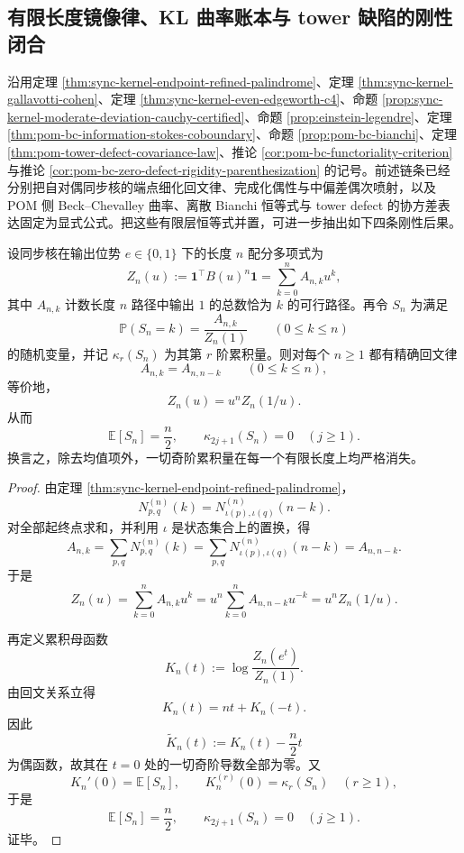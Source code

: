 \subsection{有限长度镜像律、KL 曲率账本与 tower 缺陷的刚性闭合}\label{subsec:conclusion-finite-mirror-curvature-tower-rigidity}
沿用定理 \ref{thm:sync-kernel-endpoint-refined-palindrome}、定理 \ref{thm:sync-kernel-gallavotti-cohen}、定理 \ref{thm:sync-kernel-even-edgeworth-c4}、命题 \ref{prop:sync-kernel-moderate-deviation-cauchy-certified}、命题 \ref{prop:einstein-legendre}、定理 \ref{thm:pom-bc-information-stokes-coboundary}、命题 \ref{prop:pom-bc-bianchi}、定理 \ref{thm:pom-tower-defect-covariance-law}、推论 \ref{cor:pom-bc-functoriality-criterion} 与推论 \ref{cor:pom-bc-zero-defect-rigidity-parenthesization} 的记号。前述链条已经分别把自对偶同步核的端点细化回文律、完成化偶性与中偏差偶次喷射，以及 POM 侧 Beck--Chevalley 曲率、离散 Bianchi 恒等式与 tower defect 的协方差表达固定为显式公式。把这些有限层恒等式并置，可进一步抽出如下四条刚性后果。

\begin{theorem}[自对偶同步核的有限长度镜像律与奇累积量湮灭]\label{thm:conclusion-selfdual-sync-kernel-finite-mirror-odd-cumulant}
设同步核在输出位势 \(e\in\{0,1\}\) 下的长度 \(n\) 配分多项式为
\[
Z_n(u):=\mathbf 1^\top B(u)^n\mathbf 1=\sum_{k=0}^n A_{n,k}u^k,
\]
其中 \(A_{n,k}\) 计数长度 \(n\) 路径中输出 \(1\) 的总数恰为 \(k\) 的可行路径。再令 \(S_n\) 为满足
\[
\mathbb P(S_n=k)=\frac{A_{n,k}}{Z_n(1)}
\qquad (0\le k\le n)
\]
的随机变量，并记 \(\kappa_r(S_n)\) 为其第 \(r\) 阶累积量。则对每个 \(n\ge 1\) 都有精确回文律
\[
A_{n,k}=A_{n,n-k}
\qquad (0\le k\le n),
\]
等价地，
\[
Z_n(u)=u^n Z_n(1/u).
\]
从而
\[
\mathbb E[S_n]=\frac{n}{2},
\qquad
\kappa_{2j+1}(S_n)=0
\quad (j\ge 1).
\]
换言之，除去均值项外，一切奇阶累积量在每一个有限长度上均严格消失。
\end{theorem}
\begin{proof}
由定理 \ref{thm:sync-kernel-endpoint-refined-palindrome}，
\[
N^{(n)}_{p,q}(k)=N^{(n)}_{\iota(p),\iota(q)}(n-k).
\]
对全部起终点求和，并利用 \(\iota\) 是状态集合上的置换，得
\[
A_{n,k}
=
\sum_{p,q}N^{(n)}_{p,q}(k)
=
\sum_{p,q}N^{(n)}_{\iota(p),\iota(q)}(n-k)
=
A_{n,n-k}.
\]
于是
\[
Z_n(u)
=
\sum_{k=0}^n A_{n,k}u^k
=
u^n\sum_{k=0}^n A_{n,n-k}u^{-k}
=
u^n Z_n(1/u).
\]

再定义累积母函数
\[
K_n(t):=\log\frac{Z_n(e^t)}{Z_n(1)}.
\]
由回文关系立得
\[
K_n(t)=nt+K_n(-t).
\]
因此
\[
\widetilde K_n(t):=K_n(t)-\frac{n}{2}t
\]
为偶函数，故其在 \(t=0\) 处的一切奇阶导数全部为零。又
\[
K_n'(0)=\mathbb E[S_n],
\qquad
K_n^{(r)}(0)=\kappa_r(S_n)\quad (r\ge 1),
\]
于是
\[
\mathbb E[S_n]=\frac{n}{2},
\qquad
\kappa_{2j+1}(S_n)=0\quad (j\ge 1).
\]
证毕。
\end{proof}

